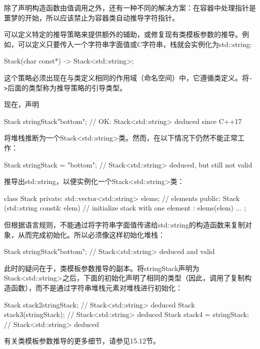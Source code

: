 除了声明构造函数由值调用之外，还有一种不同的解决方案：在容器中处理指针是噩梦的开始，所以应该禁止为容器类自动推导字符指针。

可以定义特定的推导策略来提供额外的辅助，或修复现有类模板参数的推导。例如，可以定义只要传入一个字符串字面值或C字符串，栈就会实例化为std::string:

\begin{cpp}
Stack(char const*) -> Stack<std::string>;
\end{cpp}

这个策略必须出现在与类定义相同的作用域（命名空间）中，它遵循类定义。将\texttt{->}后面的类型称为推导策略的引导类型。

现在，声明

\begin{cpp}
Stack stringStack{"bottom"}; // OK: Stack<std::string> deduced since C++17
\end{cpp}

将堆栈推断为一个Stack<std::string>类。然而，在以下情况下仍然不能正常工作：

\begin{cpp}
Stack stringStack = "bottom"; // Stack<std::string> deduced, but still not valid
\end{cpp}

推导出std::string，以便实例化一个Stack<std::string>类：

\begin{cpp}
class Stack {
private:
	std::vector<std::string> elems; // elements
public:
	Stack (std::string const& elem) // initialize stack with one element
	: elems({elem}) {
	}
	...
};
\end{cpp}

但根据语言规则，不能通过将字符串字面值传递给std::string的构造函数来复制对象，从而完成初始化。所以必须像这样初始化堆栈：

\begin{cpp}
Stack stringStack{"bottom"}; // Stack<std::string> deduced and valid
\end{cpp}

此时的疑问在于，类模板参数推导的副本。将stringStack声明为Stack<std::string>之后，下面的初始化声明了相同的类型（因此，调用了复制构造函数），而不是通过字符串堆栈元素对堆栈进行初始化：

\begin{cpp}
Stack stack2{stringStack}; // Stack<std::string> deduced
Stack stack3(stringStack); // Stack<std::string> deduced
Stack stack4 = {stringStack}; // Stack<std::string> deduced
\end{cpp}

有关类模板参数推导的更多细节，请参见15.12节。





















